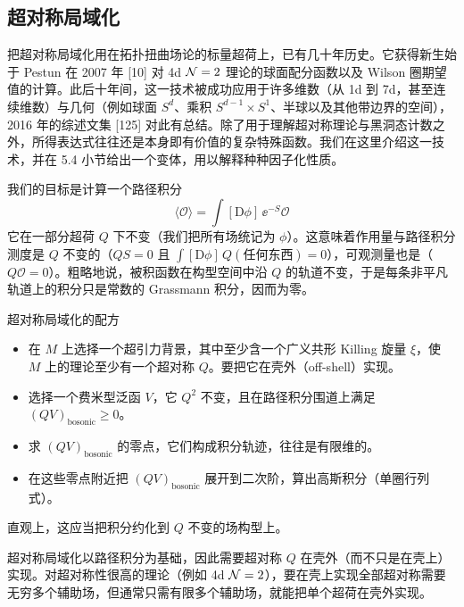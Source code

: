 
\subsection{超对称局域化}

把超对称局域化用在拓扑扭曲场论的标量超荷上，已有几十年历史。它获得新生始于 Pestun 在 2007 年 [10] 对 4d $\mathcal{N}=2$ 理论的球面配分函数以及 Wilson 圈期望值的计算。此后十年间，这一技术被成功应用于许多维数（从 1d 到 7d，甚至连续维数）与几何（例如球面 $S^d$、乘积 $S^{d-1}\times S^1$、半球以及其他带边界的空间），2016 年的综述文集 [125] 对此有总结。除了用于理解超对称理论与黑洞态计数之外，所得表达式往往还是本身即有价值的复杂特殊函数。我们在这里介绍这一技术，并在 5.4 小节给出一个变体，用以解释种种因子化性质。

 我们的目标是计算一个路径积分
\begin{equation}
  \langle\mathcal{O}\rangle=\int[\mathrm{D}\phi]\,\ee^{-S}\mathcal{O}
  \tag{5.10}
\end{equation}
它在一部分超荷 $Q$ 下不变（我们把所有场统记为 $\phi$）。这意味着作用量与路径积分测度是 $Q$ 不变的（$QS=0$ 且 $\int[\mathrm{D}\phi]\,Q(\text{任何东西})=0$），可观测量也是（$Q\mathcal{O}=0$）。粗略地说，被积函数在构型空间中沿 $Q$ 的轨道不变，于是每条非平凡轨道上的积分只是常数的 Grassmann 积分，因而为零。

\begin{keybox}{超对称局域化的配方}
\begin{itemize}[leftmargin=1.4em,itemsep=1pt,topsep=1pt]
\item 在 $M$ 上选择一个超引力背景，其中至少含一个广义共形 Killing 旋量 $\xi$，使 $M$ 上的理论至少有一个超对称 $Q$。要把它在壳外（off-shell）实现。
\item 选择一个费米型泛函 $V$，它 $Q^2$ 不变，且在路径积分围道上满足 $(QV)_{\text{bosonic}}\ge0$。
\item 求 $(QV)_{\text{bosonic}}$ 的零点，它们构成积分轨迹，往往是有限维的。
\item 在这些零点附近把 $(QV)_{\text{bosonic}}$ 展开到二次阶，算出高斯积分（单圈行列式）。
\end{itemize}
\end{keybox}

直观上，这应当把积分约化到 $Q$ 不变的场构型上。

超对称局域化以路径积分为基础，因此需要超对称 $Q$ 在壳外（而不只是在壳上）实现。对超对称性很高的理论（例如 4d $\mathcal{N}=2$），要在壳上实现全部超对称需要无穷多个辅助场，但通常只需有限多个辅助场，就能把单个超荷在壳外实现。

